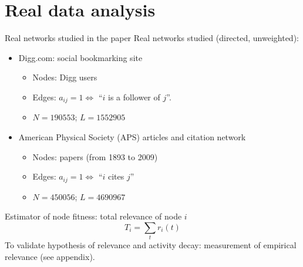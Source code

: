 \section{Real data analysis}

\begin{frame}{Real networks studied in the paper}
    Real networks studied (directed, unweighted):
    \begin{itemize}
        \item \alert{Digg.com}: social bookmarking site
        \begin{itemize}
            \item Nodes: Digg users
            \item Edges: $a_{ij}=1 \Leftrightarrow$ ``$i$ is a follower of $j$''.
            \item $N = \num{190553}$; $L = \num{1552905}$
        \end{itemize}

        \item \alert{American Physical Society} (APS) articles and citation network
        \begin{itemize}
            \item Nodes: papers (from 1893 to 2009)
            \item Edges: $a_{ij}=1 \Leftrightarrow$ ``$i$ cites $j$''
            \item $N = \num{450056}$; $L = \num{4690967}$
        \end{itemize}
    \end{itemize}
    \vspace{1em}
    Estimator of node fitness: \alert{total relevance} of node $i$
    \[
        T_i = \sum_t r_i(t)
    \]
    To validate hypothesis of relevance and activity decay: measurement of \alert{empirical relevance} (see appendix).
\end{frame}

